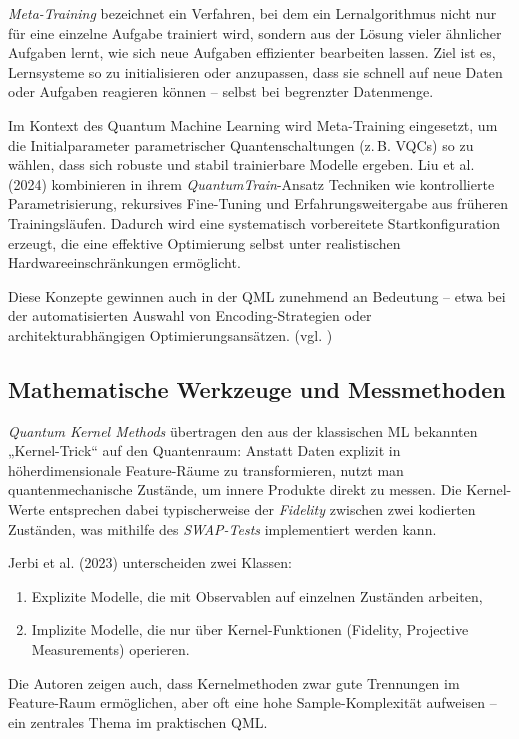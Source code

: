 \textit{Meta-Training} bezeichnet ein Verfahren, bei dem ein Lernalgorithmus nicht nur für eine einzelne Aufgabe trainiert wird, sondern aus der Lösung vieler ähnlicher Aufgaben lernt, wie sich neue Aufgaben effizienter bearbeiten lassen. Ziel ist es, Lernsysteme so zu initialisieren oder anzupassen, dass sie schnell auf neue Daten oder Aufgaben reagieren können – selbst bei begrenzter Datenmenge.

Im Kontext des Quantum Machine Learning wird Meta-Training eingesetzt, um die Initialparameter parametrischer Quantenschaltungen (z.\,B. VQCs) so zu wählen, dass sich robuste und stabil trainierbare Modelle ergeben. Liu et al. (2024) kombinieren in ihrem \textit{QuantumTrain}-Ansatz Techniken wie kontrollierte Parametrisierung, rekursives Fine-Tuning und Erfahrungsweitergabe aus früheren Trainingsläufen. Dadurch wird eine systematisch vorbereitete Startkonfiguration erzeugt, die eine effektive Optimierung selbst unter realistischen Hardwareeinschränkungen ermöglicht.

Diese Konzepte gewinnen auch in der QML zunehmend an Bedeutung – etwa bei der automatisierten Auswahl von Encoding-Strategien oder architekturabhängigen Optimierungsansätzen. (vgl. \cite{liuQuantumTrainRethinkingHybrid2024})

\vspace{0.7cm}
\subsection{Mathematische Werkzeuge und Messmethoden}  
\textit{Quantum Kernel Methods}
übertragen den aus der klassischen ML bekannten „Kernel-Trick“ auf den Quantenraum: Anstatt Daten explizit in höherdimensionale Feature-Räume zu transformieren, nutzt man quantenmechanische Zustände, um innere Produkte direkt zu messen. Die Kernel-Werte entsprechen dabei typischerweise der \textit{Fidelity} zwischen zwei kodierten Zuständen, was mithilfe des \textit{SWAP-Tests} implementiert werden kann.  

Jerbi et al. (2023) unterscheiden zwei Klassen:
\begin{enumerate}
  \item Explizite Modelle, die mit Observablen auf einzelnen Zuständen arbeiten,
  \item Implizite Modelle, die nur über Kernel-Funktionen (Fidelity, Projective Measurements) operieren.
\end{enumerate}
Die Autoren zeigen auch, dass Kernelmethoden zwar gute Trennungen im Feature-Raum ermöglichen, aber oft eine hohe Sample-Komplexität aufweisen – ein zentrales Thema im praktischen QML.


